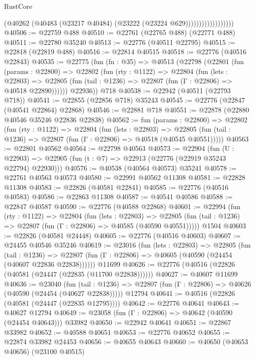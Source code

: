 \begin{lexlean}{RustCore}
\begin{coremodule}
                                (@40262
                                  (@40483 (@23217 @40484) (@23222 (@23224 @629))))))))))))))))))
@40506 := @22759 @488
@40510 := @22761 (@22765 @488) (@22771 @488)
@40511 := @22780 @35240
@40513 := @22776 (@40511 @22795)
@40515 := @22818 (@22819 @488)
@40516 := @22814 @40515
@40518 := @22776 (@40516 @22843)
@40535 := @22775
    (fun (fn : @35) =>
    @40513
      (@22798
        (@22801
          (fun (params : @22800) =>
          @22802
            (fun (rty : @1122) =>
            @22804
              (fun (lets : @22803) =>
              @22805 (fun (tail : @1236) => @22807 (fun (Γ : @22806) => @40518 @22890))))))
        @22936))
    @718
@40538 := @22942 (@40511 (@22793 @718))
@40541 := @22855 (@22856 @718) @35243
@40545 := @22776 (@22847 (@40541 @22864) @22868)
@40546 := @22881 @718
@40551 := @22878 (@22880 @40546 @35246 @22836 @22838)
@40562 := fun (params : @22800) =>
  @22802
    (fun (rty : @1122) =>
    @22804
      (fun (lets : @22803) =>
      @22805 (fun (tail : @1236) => @22807 (fun (Γ : @22806) => @40518 (@40545 @40551)))))
@40563 := @22801 @40562
@40564 := @22798 @40563
@40573 := @22904
    (fun (U : @22903) => @22905 (fun (t : @7) => @22913 (@22776 (@22919 @35243 @22794) @22930)))
@40576 := @40538 (@40564 @40573) @35241
@40578 := @22761 @40563 @40573
@40580 := @22991 @40562 @11308
@40581 := @22828 @11308
@40583 := @22826 (@40581 @22841)
@40585 := @22776 (@40516 @40583)
@40586 := @22863 @11308
@40587 := @40541 @40586
@40588 := @22847 @40587
@40590 := @22776 (@40588 @22868)
@40601 := @22994
    (fun (rty : @1122) =>
    @22804
      (fun (lets : @22803) =>
      @22805 (fun (tail : @1236) => @22807 (fun (Γ : @22806) => @40585 (@40590 @40551)))))
    @1504
@40603 := @22826 (@40581 @24448)
@40605 := @22776 (@40516 @40603)
@40607 := @24455 @40546 @35246
@40619 := @23016
    (fun (lets : @22803) =>
    @22805
      (fun (tail : @1236) =>
      @22807 (fun (Γ : @22806) => @40605 (@40590 (@24454 (@40607 @22836 @22838))))))
    @11699
@40626 := @22776 (@40516 (@22826 (@40581 (@24447 (@22835 (@11700 @22838))))))
@40627 := @40607 @11699
@40636 := @23040
    (fun (tail : @1236) => @22807 (fun (Γ : @22806) => @40626 (@40590 (@24454 (@40627 @22838)))))
    @12794
@40641 := @40516 (@22826 (@40581 (@24447 (@22835 @12795))))
@40642 := @22776 @40641
@40643 := @40627 @12794
@40649 := @23058 (fun (Γ : @22806) => @40642 (@40590 (@24454 @40643))) @33982
@40650 := @22942 @40641
@40651 := @22867 @33982
@40652 := @40588 @40651
@40653 := @22776 @40652
@40655 := @22874 @33982 @24453
@40656 := @40655 @40643
@40660 := @40650 (@40653 @40656) (@23100 @40515)

\end{coremodule}
\end{lexlean}
